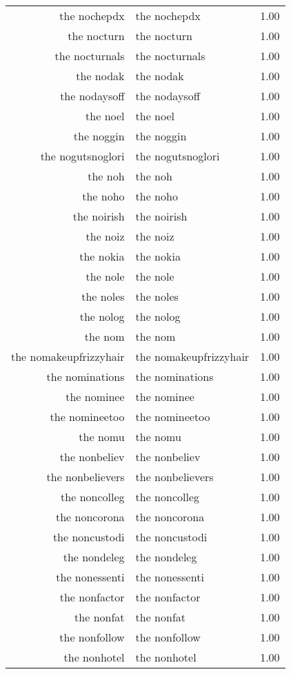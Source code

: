 \begin{table}[ht]
\begin{tabular}{rlr}
  the nochepdx & the nochepdx & 1.00 \\ 
  the nocturn & the nocturn & 1.00 \\ 
  the nocturnals & the nocturnals & 1.00 \\ 
  the nodak & the nodak & 1.00 \\ 
  the nodaysoff & the nodaysoff & 1.00 \\ 
  the noel & the noel & 1.00 \\ 
  the noggin & the noggin & 1.00 \\ 
  the nogutsnoglori & the nogutsnoglori & 1.00 \\ 
  the noh & the noh & 1.00 \\ 
  the noho & the noho & 1.00 \\ 
  the noirish & the noirish & 1.00 \\ 
  the noiz & the noiz & 1.00 \\ 
  the nokia & the nokia & 1.00 \\ 
  the nole & the nole & 1.00 \\ 
  the noles & the noles & 1.00 \\ 
  the nolog & the nolog & 1.00 \\ 
  the nom & the nom & 1.00 \\ 
  the nomakeupfrizzyhair & the nomakeupfrizzyhair & 1.00 \\ 
  the nominations & the nominations & 1.00 \\ 
  the nominee & the nominee & 1.00 \\ 
  the nomineetoo & the nomineetoo & 1.00 \\ 
  the nomu & the nomu & 1.00 \\ 
  the nonbeliev & the nonbeliev & 1.00 \\ 
  the nonbelievers & the nonbelievers & 1.00 \\ 
  the noncolleg & the noncolleg & 1.00 \\ 
  the noncorona & the noncorona & 1.00 \\ 
  the noncustodi & the noncustodi & 1.00 \\ 
  the nondeleg & the nondeleg & 1.00 \\ 
  the nonessenti & the nonessenti & 1.00 \\ 
  the nonfactor & the nonfactor & 1.00 \\ 
  the nonfat & the nonfat & 1.00 \\ 
  the nonfollow & the nonfollow & 1.00 \\ 
  the nonhotel & the nonhotel & 1.00 \\ 

\end{tabular}
\end{table}
